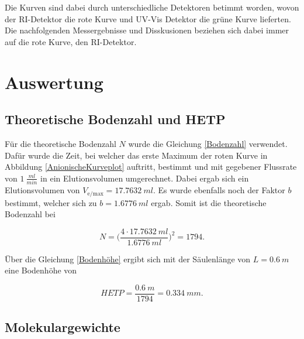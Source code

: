 \documentclass[10pt,a4paper,ngerman]{scrartcl}
\begin{document}
	Die Kurven sind dabei durch unterschiedliche Detektoren betimmt worden, wovon der RI-Detektor die rote Kurve und UV-Vis Detektor die grüne 
	Kurve lieferten. Die nachfolgenden Messergebnisse und Disskusionen beziehen sich dabei immer auf die rote Kurve, den RI-Detektor.



\section{Auswertung}

	\subsection{Theoretische Bodenzahl und HETP}

		Für die theoretische Bodenzahl $N$ wurde die Gleichung \eqref{Bodenzahl} verwendet. Dafür wurde die Zeit, bei welcher das erste Maximum der 
		roten Kurve in Abbildung \ref{AnionischeKurveplot} auftritt, bestimmt und mit gegebener Flussrate von $\SI{1}{\frac{ml}{min}}$ in ein 
		Elutionsvolumen umgerechnet. Dabei ergab sich ein Elutionsvolumen von $V_\text{e/max} = \SI{17,7632}{ml}$. Es wurde ebenfalls noch der Faktor 
		$b$ bestimmt, welcher sich zu $b = \SI{1,6776}{ml}$ ergab. Somit ist die theoretische Bodenzahl bei 

		\begin{equation}
			N = \bigl(\frac{4 \cdot \SI{17,7632}{ml}}{\SI{1,6776}{ml}}\bigr)^2 = 1794 \text{.}
		\end{equation}

		Über die Gleichung \eqref{Bodenhöhe} ergibt sich mit der Säulenlänge von $L = \SI{0,6}{m}$ eine Bodenhöhe von 

		\begin{equation}
			HETP = \frac{\SI{0,6}{m}}{1794} = \SI{0,334}{mm} \text{.}
		\end{equation}

	\subsection{Molekulargewichte}
\end{document}
